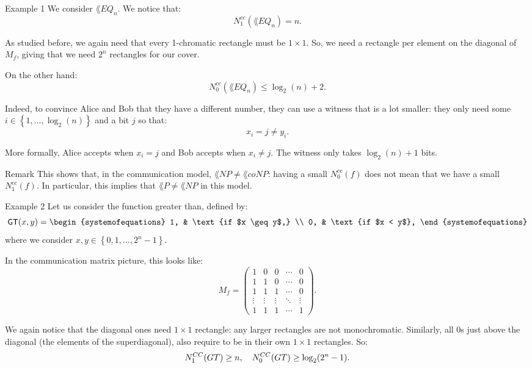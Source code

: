 \documentclass[a4paper]{article}
\begin{document}
\begin{parag}{Example 1}
    We consider $\lang{EQ}_n$. We notice that: 
    \[N_1^{cc}\left(\lang{EQ}_n\right) = n.\]

    As studied before, we again need that every 1-chromatic rectangle must be $1 \times 1$. So, we need a rectangle per element on the diagonal of $M_f$, giving that we need $2^n$ rectangles for our cover.

    On the other hand:
    \[N_0^{cc}\left(\lang{EQ}_n\right) \leq \log_2\left(n\right) + 2.\]

    Indeed, to convince Alice and Bob that they have a different number, they can use a witness that is a lot smaller: they only need some $i \in \left\{1, \ldots, \log_2\left(n\right)\right\}$ and a bit $j$ so that: 
    \[x_i = j \neq y_i.\]

    More formally, Alice accepts when $x_i = j$ and Bob accepts when $x_i \neq j$. The witness only takes $\log_2\left(n\right) + 1$ bits.

    \begin{subparag}{Remark}
        This shows that, in the communication model, $\lang{NP} \neq \lang{coNP}$: having a small $N_0^{cc}\left(f\right)$ does not mean that we have a small $N_1^{cc}\left(f\right)$. In particular, this implies that $\lang{P} \neq \lang{NP}$ in this model.
    \end{subparag}
\end{parag}

\begin{parag}{Example 2}
    Let us consider the function greater than, defined by: 
    \[\lang{GT}\left(x, y\right) = \begin{systemofequations} 1, & \text{if $x \geq y$,} \\ 0, & \text{if $x < y$}, \end{systemofequations}\]
    where we consider $x, y \in \left\{0, 1, \ldots, 2^n - 1\right\}$.
    
    In the communication matrix picture, this looks like: 
    \[M_f = \begin{pmatrix} 1 & 0 & 0 & \cdots & 0 \\ 1 & 1 & 0 & \cdots & 0 \\ 1 & 1 & 1 & \cdots & 0 \\ \vdots & \vdots & \vdots & \ddots & \vdots \\ 1 & 1 & 1 & \cdots & 1 \end{pmatrix}.\]

    We again notice that the diagonal ones need $1 \times 1$ rectangle: any larger rectangles are not monochromatic. Similarly, all 0s just above the diagonal (the elements of the superdiagonal), also require to be in their own $1 \times 1$ rectangles. So: 
    \[N_1^{CC}\left(GT\right) \geq n, \mathspace N_0^{CC}\left(GT\right) \geq \log_2\left(2^n - 1\right).\]
\end{parag}
\end{document}
